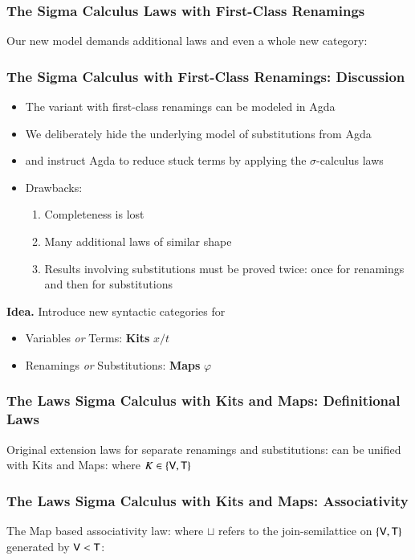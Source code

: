 \documentclass[dvipsnames,aspectratio=169,pdftex]{beamer}
\begin{document}
\begin{frame}[fragile]
  \frametitle{The Sigma Calculus Laws with First-Class Renamings}
  Our new model demands additional laws
  \EAssoc{}
  and even a whole new category:
  \ECoincidenceLaw{}
\end{frame}

\begin{frame}[fragile]
  \frametitle{The Sigma Calculus with First-Class Renamings: Discussion}
  \begin{itemize}
    \item The variant with first-class renamings can be modeled in Agda
    \item We deliberately hide the underlying model of substitutions from Agda
    \item and instruct Agda to reduce stuck terms by applying the $\sigma$-calculus laws
    \item Drawbacks:
          \begin{enumerate}
            \item Completeness is lost
            \item Many additional laws of similar shape
            \item Results involving substitutions must be proved twice: once for renamings and
                  then for substitutions
          \end{enumerate}
  \end{itemize}

  \vspace{1em}
  \textbf{Idea.}
  Introduce new syntactic categories for
  \begin{itemize}
    \item Variables \emph{or} Terms: \textbf{Kits} $x/t$
    \item Renamings \emph{or} Substitutions: \textbf{Maps} $\varphi$
  \end{itemize}
\end{frame}

\begin{frame}[fragile]
  \frametitle{The Laws Sigma Calculus with Kits and Maps: Definitional Laws}
  Original extension laws for separate renamings and substitutions:
  \EDefLaws{}
  can be unified with Kits and Maps:
  \EExtLaws{}
  where  $K \in \{\AgdaFunction{V}, \AgdaFunction{T}\}$
\end{frame}

\begin{frame}[fragile]
  \frametitle{The Laws Sigma Calculus with Kits and Maps: Associativity}
  The Map based associativity law:
  \EEAssoc{}
  where $\sqcup$ refers to the join-semilattice on $\{\AgdaFunction{V},
    \AgdaFunction{T}\}$ generated by $\AgdaFunction{V} <  \AgdaFunction{T}$:
  \ETypeLevel{}
\end{frame}
\end{document}
